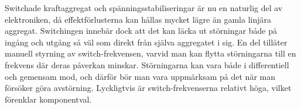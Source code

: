 Switchade kraftaggregat och spänningsstabiliseringar är nu en naturlig del
av elektroniken, då effektförlusterna kan hållas mycket lägre än gamla
linjära aggregat.
Switchingen innebär dock att det kan läcka ut störningar både på ingång och
utgång så väl som direkt från själva aggregatet i sig.
En del tillåter manuell styrning av switch-frekvensen, varvid man kan flytta
störningarna till en frekvens där deras påverkan minskar.
Störningarna kan vara både i differentiell och gemensam mod, och därför bör man
vara uppmärksam på det när man försöker göra avstörning.
Lyckligtvis är switch-frekvenserna relativt höga, vilket förenklar komponentval.
